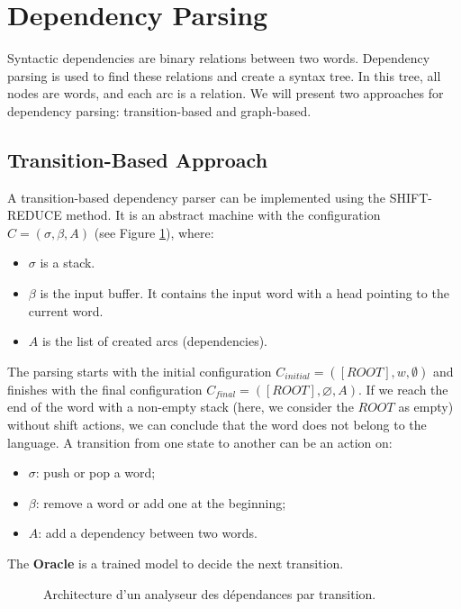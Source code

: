 \documentclass{KodeBook}
\begin{document}
\section{Dependency Parsing}

Syntactic dependencies are binary relations between two words. Dependency parsing is used to find these relations and create a syntax tree. In this tree, all nodes are words, and each arc is a relation. We will present two approaches for dependency parsing: transition-based and graph-based.

\subsection{Transition-Based Approach}

A transition-based dependency parser can be implemented using the SHIFT-REDUCE method. It is an abstract machine with the configuration \(C = (\sigma, \beta, A)\) (see Figure \ref{fig:dep-trans-arch}), where:
\begin{itemize}
	\item \(\sigma\) is a stack.
	\item \(\beta\) is the input buffer. It contains the input word with a head pointing to the current word.
	\item \(A\) is the list of created arcs (dependencies).
\end{itemize}
The parsing starts with the initial configuration \(C_{initial} = ([ROOT], w, \emptyset)\) and finishes with the final configuration \(C_{final} = ([ROOT], \varnothing, A)\). If we reach the end of the word with a non-empty stack (here, we consider the \(ROOT\) as empty) without shift actions, we can conclude that the word does not belong to the language. A transition from one state to another can be an action on:
\begin{itemize}
	\item \(\sigma\): push or pop a word;
	\item \(\beta\): remove a word or add one at the beginning;
	\item \(A\): add a dependency between two words.
\end{itemize}
The \textbf{Oracle} is a trained model to decide the next transition.


\begin{figure}[ht]
	\centering
	\caption{Architecture d'un analyseur des dépendances par transition.}
	\label{fig:dep-trans-arch}
\end{figure}
\end{document}
